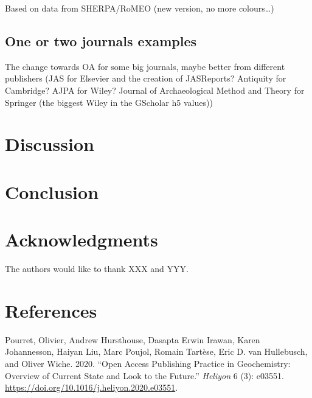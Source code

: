 \documentclass[fleqn,10pt,lineno]{wlpeerj} %
\newlength{\cslhangindent}
\newenvironment{cslreferences}%
  {\setlength{\parindent}{0pt}%
  \everypar{\setlength{\hangindent}{\cslhangindent}}\ignorespaces}%
  {\par}
\begin{document}
Based on data from SHERPA/RoMEO (new version, no more colours\ldots)

\hypertarget{one-or-two-journals-examples}{%
\subsection*{One or two journals examples}\label{one-or-two-journals-examples}}

The change towards OA for some big journals, maybe better from different publishers (JAS for Elsevier and the creation of JASReports? Antiquity for Cambridge? AJPA for Wiley? Journal of Archaeological Method and Theory
for Springer (the biggest Wiley in the GScholar h5 values))

\hypertarget{discussion}{%
\section*{Discussion}\label{discussion}}

\hypertarget{conclusion}{%
\section*{Conclusion}\label{conclusion}}

\hypertarget{acknowledgments}{%
\section*{Acknowledgments}\label{acknowledgments}}

The authors would like to thank XXX and YYY.

\hypertarget{references}{%
\section*{References}\label{references}}

\hypertarget{refs}{}
\begin{cslreferences}
\leavevmode\hypertarget{ref-pourret_open_2020}{}%
Pourret, Olivier, Andrew Hursthouse, Dasapta Erwin Irawan, Karen Johannesson, Haiyan Liu, Marc Poujol, Romain Tartèse, Eric D. van Hullebusch, and Oliver Wiche. 2020. ``Open Access Publishing Practice in Geochemistry: Overview of Current State and Look to the Future.'' \emph{Heliyon} 6 (3): e03551. \url{https://doi.org/10.1016/j.heliyon.2020.e03551}.
\end{cslreferences}
\end{document}
